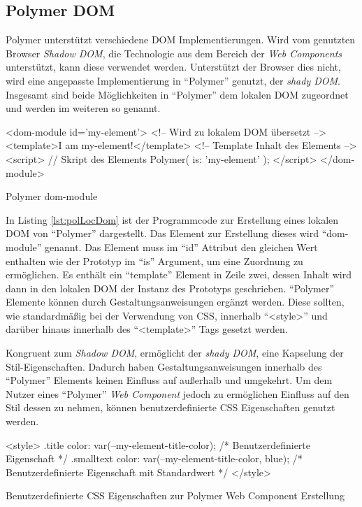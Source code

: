 \documentclass[12pt, paper=a4, bibtotoc, toc=listof, headsepline=true]{scrreprt}
\begin{document}
\subsection{Polymer DOM}
Polymer unterstützt verschiedene \ac{DOM} Implementierungen. Wird vom genutzten Browser \emph{Shadow DOM}, die Technologie aus dem Bereich der \emph{Web Components} unterstützt, kann diese verwendet werden. Unterstützt der Browser dies nicht, wird eine angepasste Implementierung in \enquote{Polymer} genutzt, der \emph{shady DOM}. Insgesamt sind beide Möglichkeiten in \enquote{Polymer} dem lokalen \ac{DOM} zugeordnet und werden im weiteren so genannt\cite{polLocDom}.
\begin{listing}
	\begin{HTMLcode*}{}
<dom-module id='my-element'> <!-- Wird zu lokalem DOM übersetzt -->
   <template>I am my-element!</template>  <!-- Template Inhalt des Elements -->
   <script>  // Skript des Elements
      Polymer({
      is: 'my-element'
      });
   </script>
</dom-module>
	\end{HTMLcode*}
	\caption{Polymer dom-module}
	\label{lst:polLocDom}
\end{listing}
In Listing \ref{lst:polLocDom} ist der Programmcode zur Erstellung eines lokalen \ac{DOM} von \enquote{Polymer} dargestellt. Das Element zur Erstellung dieses wird \enquote{dom-module} genannt. Das Element muss im \enquote{id} Attribut den gleichen Wert enthalten wie der Prototyp im \enquote{is} Argument, um eine Zuordnung zu ermöglichen. Es enthält ein \enquote{template} Element in Zeile zwei, dessen Inhalt wird dann in den lokalen \ac{DOM} der Instanz des Prototyps geschrieben. \newline
\enquote{Polymer} Elemente können durch Gestaltungsanweisungen ergänzt werden. Diese sollten, wie standardmäßig bei der Verwendung von \ac{CSS}, innerhalb \enquote{<style>} und darüber hinaus innerhalb des \enquote{<template>} Tags gesetzt werden.

\newline
Kongruent zum \emph{Shadow DOM}, ermöglicht der \emph{shady DOM}, eine Kapselung der Stil-Eigenschaften. Dadurch haben Gestaltungsanweisungen innerhalb des \enquote{Polymer} Elements keinen Einfluss auf außerhalb und umgekehrt. Um dem Nutzer eines \enquote{Polymer} \emph{Web Component} jedoch zu ermöglichen Einfluss auf den Stil dessen zu nehmen, können benutzerdefinierte \ac{CSS} Eigenschaften genutzt werden\cite{polStyLocDom}.
\begin{listing}
	\begin{HTMLcode*}{}
<style>
.title {
	color: var(--my-element-title-color); /* Benutzerdefinierte Eigenschaft */
}
.smalltext {
	color: var(--my-element-title-color, blue); /* Benutzerdefinierte Eigenschaft mit Standardwert */
}
</style>
	\end{HTMLcode*}
	\caption[Benutzerdefinierte CSS Eigenschaften]{Benutzerdefinierte CSS Eigenschaften zur Polymer Web Component Erstellung}
	\label{lst:benCss}
\end{listing}
\end{document}
